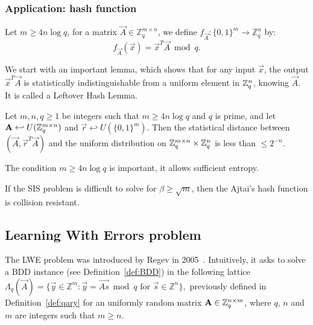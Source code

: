 \subsubsection{Application: hash function}

\begin{definition}
Let $m \geq 4 n \log q$, for a matrix $\vec{A} \in \mathbb{Z}_q^{m \times n}$, we define $f_{\vec{A}} : \{0,1\}^m \rightarrow \mathbb{Z}_q^n$ by:
$$ f_{\vec{A}} (\vec{x}) = \vec{x}^T \vec{A} \bmod q.$$
\end{definition}


We start with an important lemma, which shows that for any input $\vec{x}$, the output $ \vec{x}^T \vec{A}$ is statistically indistinguishable from a uniform element in $\mathbb{Z}_q^{n}$, knowing $\vec{A}$. It is called a Leftover Hash Lemma.

\begin{lemma}
\label{le:LHL}
Let $m, n, q \ge 1$ be integers such that $m \geq 4 n \log q$ and $q$ is prime, and let $\mathbf{A} \hookleftarrow U(\mathbb{Z}_q^{m \times n})$ and $\vec{r} \hookleftarrow U(\{0,1\}^m)$. Then the statistical distance between $(\vec{A},\vec{r}^T \vec{A})$ and the uniform distribution on $\mathbb{Z}_q^{m \times n} \times \mathbb{Z}_q^{n}$ is less than $\leq 2^{-n}$.
\end{lemma}

The condition  $m \geq 4 n \log q$ is important, it allows sufficient entropy.



\begin{theorem}
\label{th:resistanceCollision}
If the SIS problem is difficult to solve for $\beta \geq \sqrt{m}$, then the Ajtai's hash function is collision resistant.
\end{theorem}

\subsection{Learning With Errors problem}

The LWE problem was introduced by Regev in 2005~\cite{Reg05}. Intuitively, it asks to solve a BDD instance (see Definition~\ref{def:BDD}) in the following lattice $ \Lambda_q(\vec{A}) = \{ \vec{y} \in \mathbb{Z}^m : \vec{y} =\vec{As} \bmod q \text{ for } \vec{s} \in \mathbb{Z}^n\},$ previously defined in Definition~\ref{def:qary} for an uniformly random matrix ${\bf A} \in \mathbb{Z}_q^{n \times m}$, where $q$, $n$ and $m$ are integers such that $m \geq n$.




